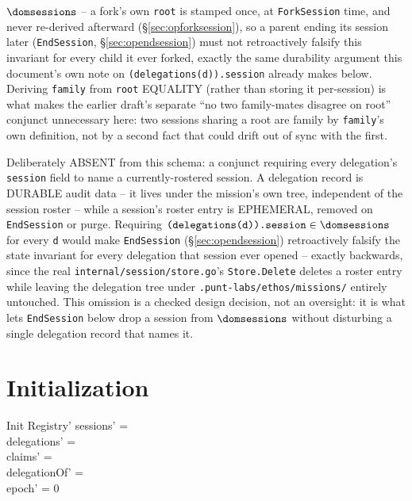 \documentclass[a4paper,10pt,fleqn]{article}
\newcommand{\fpath}[1]{\texttt{#1}}
\newcommand{\field}[1]{\texttt{#1}}
\begin{document}
\begin{itemize}
    $\dom \field{sessions}$ -- a fork's own \field{root} is stamped once,
    at \field{ForkSession} time, and never re-derived afterward
    (\S\ref{sec:opforksession}), so a parent ending its session later
    (\field{EndSession}, \S\ref{sec:opendsession}) must not retroactively
    falsify this invariant for every child it ever forked, exactly the
    same durability argument this document's own note on
    \field{(delegations(d)).session} already makes below. Deriving
    \field{family} from \field{root} EQUALITY (rather than storing it
    per-session) is what makes the earlier draft's separate
    ``no two family-mates disagree on root'' conjunct unnecessary here:
    two sessions sharing a root are family by \field{family}'s own
    definition, not by a second fact that could drift out of sync with
    the first.
\end{itemize}

Deliberately ABSENT from this schema: a conjunct requiring every
delegation's \field{session} field to name a currently-rostered
session. A delegation record is DURABLE audit data -- it lives under
the mission's own tree, independent of the session roster -- while a
session's roster entry is EPHEMERAL, removed on \field{EndSession} or
purge. Requiring $\field{(delegations(d)).session} \in \dom \field{sessions}$ for
every \field{d} would make \field{EndSession} (\S\ref{sec:opendsession})
retroactively falsify the state invariant for every delegation that
session ever opened -- exactly backwards, since the real
\fpath{internal/session/store.go}'s \field{Store.Delete} deletes a
roster entry while leaving the delegation tree under
\fpath{.punt-labs/ethos/missions/} entirely untouched. This omission is
a checked design decision, not an oversight: it is what lets
\field{EndSession} below drop a session from $\dom \field{sessions}$
without disturbing a single delegation record that names it.

\section{Initialization}
\label{sec:init}

\begin{schema}{Init}
Registry'
\where
sessions' = \emptyset \\
delegations' = \emptyset \\
claims' = \emptyset \\
delegationOf' = \emptyset \\
epoch' = 0
\end{schema}
\end{document}
